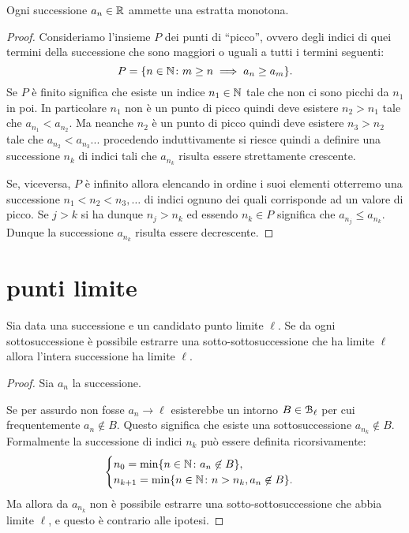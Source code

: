 \begin{lemma}
Ogni successione $a_n\in \mathbb R$ ammette una estratta monotona.
\end{lemma}
%
\begin{proof}
Consideriamo l'insieme $P$ dei punti di ``picco'', ovvero degli indici
di quei termini della successione che sono maggiori o uguali a tutti i termini
seguenti:
\[
  P = \{n\in \mathbb N\colon m\ge n \implies a_n\ge a_m\}.
\]
Se $P$ è finito significa che esiste un indice $n_1\in \mathbb N$ tale
che non ci sono picchi da $n_1$ in poi. In particolare $n_1$ non è un punto di
picco
quindi deve esistere $n_2>n_1$ tale che $a_{n_1}<a_{n_2}$.
Ma neanche $n_2$ è un punto di picco quindi deve esistere $n_3>n_2$ tale
che $a_{n_2}<a_{n_3}$... procedendo induttivamente si riesce quindi a definire
una successione $n_k$ di indici tali che $a_{n_k}$ risulta essere strettamente
crescente.

Se, viceversa, $P$ è infinito allora elencando in ordine i suoi elementi otterremo
una successione $n_1 < n_2 < n_3, \dots$ di indici ognuno dei quali corrisponde ad un valore
di picco. Se $j>k$ si ha dunque $n_j>n_k$ ed essendo $n_k\in P$ significa che
$a_{n_j} \le a_{n_k}$. Dunque la successione $a_{n_k}$ risulta essere decrescente.
\end{proof}


\section{punti limite}

\begin{proposition}
  \label{prop:convergenza}
Sia data una successione e un candidato punto limite $\ell$.
Se da ogni sottosuccessione è possibile estrarre una sotto-sottosuccessione
che ha limite $\ell$ allora l'intera successione ha limite $\ell$.
\end{proposition}
%
\begin{proof}
  Sia $a_n$ la successione.

  Se per assurdo non fosse $a_n \to \ell$
  esisterebbe un intorno $B\in \mathcal B_\ell$
  per cui frequentemente $a_n \not \in B$.
  Questo significa che esiste una sottosuccessione
  $a_{n_k} \not \in B$. Formalmente
  la successione di indici $n_k$ può essere definita
  ricorsivamente:
  \[
    \begin{cases}
      n_0 = \min \{n\in \mathbb N \colon a_n \not \in B\}, \\
      n_{k+1} = \min \{n\in \mathbb N \colon n>n_k, a_n \not \in B\}.
    \end{cases}
  \]
  Ma allora da $a_{n_k}$
  non è possibile estrarre una sotto-sottosuccessione
  che abbia limite $\ell$, e questo è contrario alle
  ipotesi.
\end{proof}


